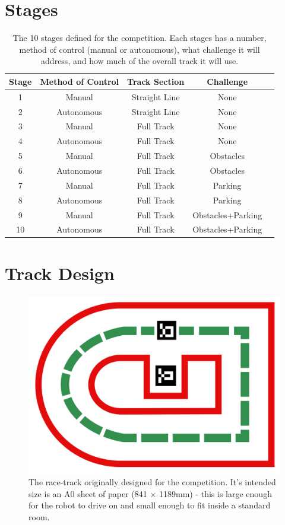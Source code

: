 \documentclass{l4proj}
\begin{document}
\begin{appendices}
\section{Stages}
\begin{table}[!h]
    \centering
    \caption{The 10 stages defined for the competition. Each stages has a number, method of control (manual or autonomous), what challenge it will address, and how much of the overall track it will use.}
    \label{tab:stages}
    \begin{tabular}{@{}|c|c|c|c|c|@{}}
        \toprule
        \multicolumn{1}{|c|}{\textbf{Stage}} & \multicolumn{1}{c|}{\textbf{Method of Control}} & \multicolumn{1}{c|}{\textbf{Track Section}} & \multicolumn{1}{c|}{\textbf{Challenge}} \\ \midrule
        1 & Manual & Straight Line & None \\
        2 & Autonomous & Straight Line & None \\
        3 & Manual & Full Track & None \\
        4 & Autonomous & Full Track & None \\
        5 & Manual & Full Track & Obstacles \\
        6 & Autonomous & Full Track & Obstacles \\
        7 & Manual & Full Track & Parking \\
        8 & Autonomous & Full Track & Parking \\
        9 & Manual & Full Track & Obstacles+Parking \\
        10 & Autonomous & Full Track & Obstacles+Parking \\
        \bottomrule
    \end{tabular}
\end{table}


\section{Track Design}
\begin{figure}[!h]
    \centering
    \includegraphics[width=0.5\linewidth]{images/final_track_design.png}
    \caption{The race-track originally designed for the competition. It's intended size is an A0 sheet of paper (841 $\times$ 1189mm) - this is large enough for the robot to drive on and small enough to fit inside a standard room.}
    \label{fig:track-design}
\end{figure}



\end{appendices}
\end{document}
